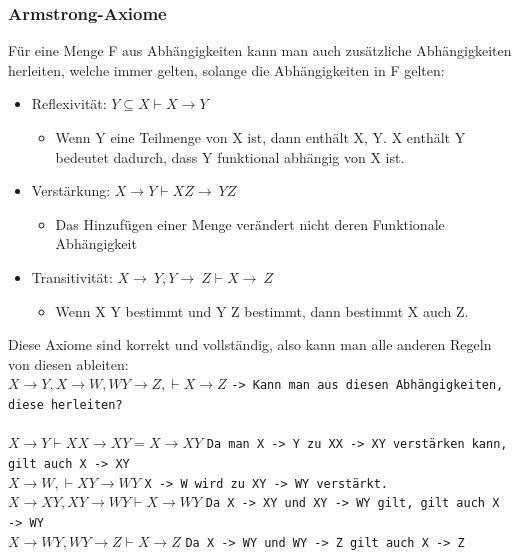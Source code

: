 \documentclass{article}
\begin{document}
	\subsubsection{Armstrong-Axiome}
	Für eine Menge F aus Abhängigkeiten kann man auch zusätzliche Abhängigkeiten herleiten, welche immer gelten, solange die Abhängigkeiten in F gelten:
	\begin{itemize}
		\item{Reflexivität: $Y \subseteq X \vdash X\to Y$}
		\begin{itemize}
			\item{Wenn Y eine Teilmenge von X ist, dann enthält X, Y. X enthält Y bedeutet dadurch, dass Y funktional abhängig von X ist.}
		\end{itemize}
		\item{Verstärkung: $X \to Y \vdash XZ \to\ YZ$}
		\begin{itemize}
			\item{Das Hinzufügen einer Menge verändert nicht deren Funktionale Abhängigkeit}
		\end{itemize}
		\item{Transitivität: $X\to\ Y, Y\to\ Z \vdash X\to\ Z$}
		\begin{itemize}
			\item{Wenn X Y bestimmt und Y Z bestimmt, dann bestimmt X auch Z.}
		\end{itemize}
	\end{itemize}
	Diese Axiome sind korrekt und vollständig, also kann man alle anderen Regeln von diesen ableiten: \\
	$X\to Y, X\to W, WY\to Z, \vdash X\to Z$ \verb|-> Kann man aus diesen Abhängigkeiten, diese herleiten?| \\ \\
	$X\to Y\vdash XX\to XY=X\to XY$ \verb|Da man X -> Y zu XX -> XY verstärken kann, gilt auch X -> XY| \\
	$X\to W, \vdash XY\to WY$ \verb|X -> W wird zu XY -> WY verstärkt.| \\
	$X\to XY, XY\to WY \vdash X\to WY$ \verb|Da X -> XY und XY -> WY gilt, gilt auch X -> WY| \\
	$X\to WY, WY\to Z \vdash X\to Z$ \verb|Da X -> WY und WY -> Z gilt auch X -> Z|
\end{document}

